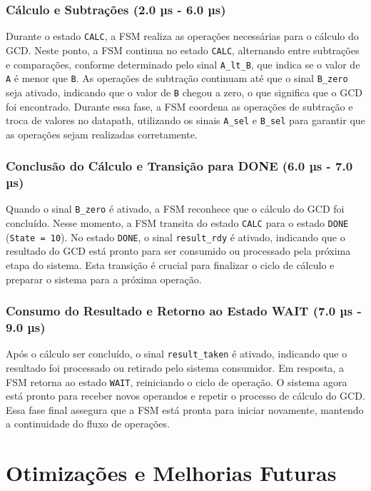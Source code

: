 \documentclass[a4paper,11pt]{article} %
\begin{document}
\subsubsection{Cálculo e Subtrações (2.0 µs - 6.0 µs)}

Durante o estado \texttt{CALC}, a FSM realiza as operações necessárias para o cálculo do GCD. Neste ponto, a FSM continua no estado \texttt{CALC}, alternando entre subtrações e comparações, conforme determinado pelo sinal \texttt{A\_lt\_B}, que indica se o valor de \texttt{A} é menor que \texttt{B}. As operações de subtração continuam até que o sinal \texttt{B\_zero} seja ativado, indicando que o valor de \texttt{B} chegou a zero, o que significa que o GCD foi encontrado. Durante essa fase, a FSM coordena as operações de subtração e troca de valores no datapath, utilizando os sinais \texttt{A\_sel} e \texttt{B\_sel} para garantir que as operações sejam realizadas corretamente.

\subsubsection{Conclusão do Cálculo e Transição para DONE (6.0 µs - 7.0 µs)}

Quando o sinal \texttt{B\_zero} é ativado, a FSM reconhece que o cálculo do GCD foi concluído. Nesse momento, a FSM transita do estado \texttt{CALC} para o estado \texttt{DONE} (\texttt{State = 10}). No estado \texttt{DONE}, o sinal \texttt{result\_rdy} é ativado, indicando que o resultado do GCD está pronto para ser consumido ou processado pela próxima etapa do sistema. Esta transição é crucial para finalizar o ciclo de cálculo e preparar o sistema para a próxima operação.

\subsubsection{Consumo do Resultado e Retorno ao Estado WAIT (7.0 µs - 9.0 µs)}

Após o cálculo ser concluído, o sinal \texttt{result\_taken} é ativado, indicando que o resultado foi processado ou retirado pelo sistema consumidor. Em resposta, a FSM retorna ao estado \texttt{WAIT}, reiniciando o ciclo de operação. O sistema agora está pronto para receber novos operandos e repetir o processo de cálculo do GCD. Essa fase final assegura que a FSM está pronta para iniciar novamente, mantendo a continuidade do fluxo de operações.

\section{Otimizações e Melhorias Futuras}
\end{document}
